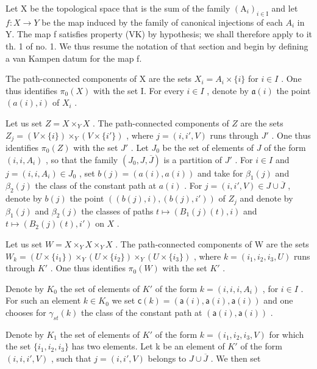 Let X be the topological space that is the sum of the family \((\mathrm{A}_{i})_{i\in\mathrm{I}}\) and let \(f\colon X\to Y\) be the map induced by the family of canonical injections of each \(A_{i}\) in Y. The map f satisfies property (VK) by hypothesis; we shall therefore apply to it th. 1 of no. 1. We thus resume the notation of that section and begin by defining a van Kampen datum for the map f.

The path-connected components of X are the sets \(X_{i} = A_{i} \times \{i\}\) for \(i \in I\) . One thus identifies \(\pi_{0}(X)\) with the set I. For every \(i \in I\) , denote by \(\mathfrak{a}(i)\) the point \((a(i), i)\) of \(X_{i}\) .

Let us set \(Z = X \times_{Y} X\) . The path-connected components of \(Z\) are the sets \(Z_j = (V \times \{i\}) \times_{Y} (V \times \{i'\})\) , where \(j = (i, i', V)\) runs through \(J'\) . One thus identifies \(\pi_0(Z)\) with the set \(J'\) . Let \(J_0\) be the set of elements of \(J\) of the form \((i, i, A_i)\) , so that the family \((J_0, J, \overline{J})\) is a partition of \(J'\) . For \(i \in I\) and \(j = (i, i, A_i) \in J_0\) , set \(b(j) = (a(i), a(i))\) and take for \(\beta_1(j)\) and \(\beta_2(j)\) the class of the constant path at \(a(i)\) . For \(j = (i, i', V) \in J \cup \overline{J}\) , denote by \(b(j)\) the point \(((b(j), i), (b(j), i'))\) of \(Z_j\) and denote by \(\beta_1(j)\) and \(\beta_2(j)\) the classes of paths \(t \mapsto (B_1(j)(t), i)\) and \(t \mapsto (B_2(j)(t), i')\) on \(X\) .

Let us set \(W = X \times_{Y} X \times_{Y} X\) . The path-connected components of W are the sets \(W_k = (U \times \{i_1\}) \times_{Y} (U \times \{i_2\}) \times_{Y} (U \times \{i_3\})\) , where \(k = (i_1, i_2, i_3, U)\) runs through \(K'\) . One thus identifies \(\pi_0(W)\) with the set \(K'\) .

Denote by \(K_{0}\) the set of elements of \(K'\) of the form \(k = (i, i, i, A_{i})\) , for \(i \in I\) . For such an element \(k \in K_{0}\) we set \(\mathsf{c}(k) = (\mathsf{a}(i), \mathsf{a}(i), \mathsf{a}(i))\) and one chooses for \(\gamma_{st}(k)\) the class of the constant path at \((\mathsf{a}(i), \mathsf{a}(i))\) .

Denote by \(K_{1}\) the set of elements of \(K'\) of the form \(k = (i_{1}, i_{2}, i_{3}, V)\) for which the set \(\{i_{1}, i_{2}, i_{3}\}\) has two elements. Let k be an element of \(K'\) of the form \((i, i, i', V)\) , such that \(j = (i, i', V)\) belongs to \(J \cup \overline{J}\) . We then set

